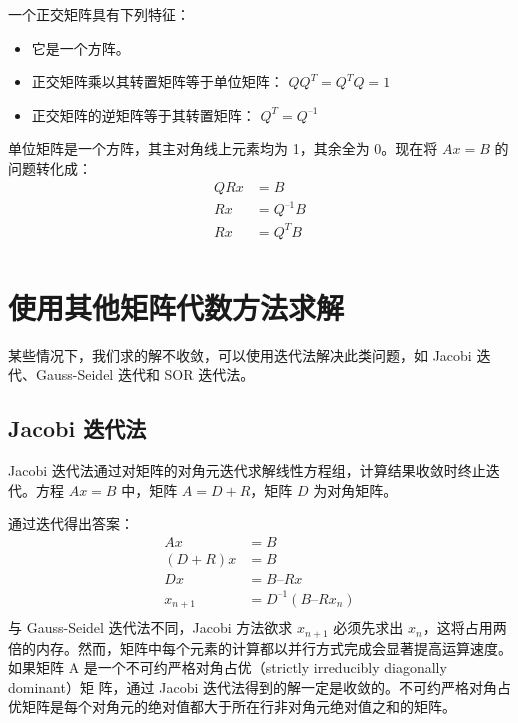 一个正交矩阵具有下列特征：
\begin{itemize}
    \item 它是一个方阵。
    \item 正交矩阵乘以其转置矩阵等于单位矩阵：
          $QQ^T = Q^TQ = 1$
    \item 正交矩阵的逆矩阵等于其转置矩阵：
          $Q^T = Q^{–1}$
\end{itemize}
单位矩阵是一个方阵，其主对角线上元素均为 1，其余全为 0。现在将 $Ax = B$ 的问题转化成：
\begin{equation}
    \begin{aligned}
        QRx & = B       \\
        Rx  & = Q^{–1}B \\
        Rx  & = Q^TB    \\
    \end{aligned}
\end{equation}

\section{使用其他矩阵代数方法求解}
某些情况下，我们求的解不收敛，可以使用迭代法解决此类问题，如 Jacobi 迭代、Gauss-Seidel 迭代和 SOR 迭代法。
\subsection{Jacobi 迭代法}
Jacobi 迭代法通过对矩阵的对角元迭代求解线性方程组，计算结果收敛时终止迭代。方程 $Ax = B$ 中，矩阵 $A = D + R$，矩阵 $D$ 为对角矩阵。

通过迭代得出答案：
\begin{equation}
    \begin{aligned}
        Ax       & = B                \\
        (D + R)x & = B                \\
        Dx       & = B – Rx           \\
        x_{n+1}  & = D^{–1}(B – Rx_n) \\
    \end{aligned}
\end{equation}
与 Gauss-Seidel 迭代法不同，Jacobi 方法欲求 $x_{n+1}$ 必须先求出 $x_n$，这将占用两倍的内存。然而，矩阵中每个元素的计算都以并行方式完成会显著提高运算速度。如果矩阵 A 是一个不可约严格对角占优（strictly irreducibly diagonally dominant）矩 阵，通过 Jacobi 迭代法得到的解一定是收敛的。不可约严格对角占优矩阵是每个对角元的绝对值都大于所在行非对角元绝对值之和的矩阵。

